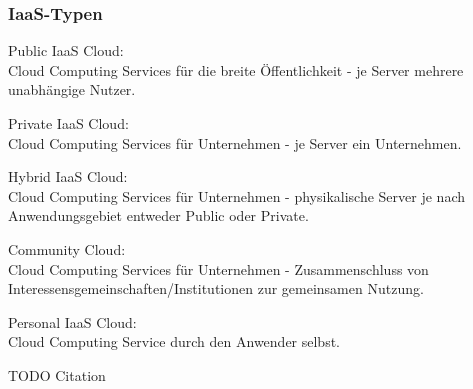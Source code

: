 \documentclass[13pt,a4paper,bibliography=totocnumbered,listof=totocnumbered]{scrartcl}
\begin{document}
\subsubsection{IaaS-Typen}
\begin{compactitem}
\item Public IaaS Cloud:\\
Cloud Computing Services für die breite Öffentlichkeit - je Server mehrere unabhängige Nutzer.
\item Private IaaS Cloud:\\
Cloud Computing Services für Unternehmen - je Server ein Unternehmen.
\item Hybrid IaaS Cloud:\\
Cloud Computing Services für Unternehmen - physikalische Server je nach Anwendungsgebiet entweder Public oder Private.
\item Community Cloud:\\
Cloud Computing Services für Unternehmen - Zusammenschluss von Interessensgemeinschaften/Institutionen zur gemeinsamen Nutzung.
\item Personal IaaS Cloud:\\
Cloud Computing Service durch den Anwender selbst.
\end{compactitem}

TODO Citation
\end{document}
